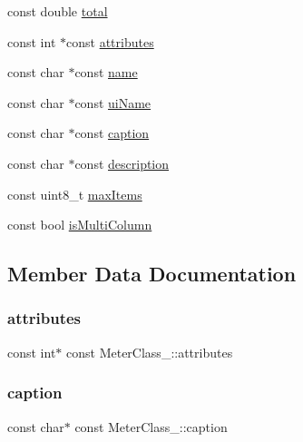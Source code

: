 \begin{DoxyCompactItemize}
const double \hyperlink{structMeterClass___ab09ccbd8eced02558e4b8f5e89d26516}{total}
\item 
const int $\ast$const \hyperlink{structMeterClass___a1a0ec53c0d54b5ba65574802d4d537d1}{attributes}
\item 
const char $\ast$const \hyperlink{structMeterClass___aacd3db709a2b1f8ec65b8ce790160517}{name}
\item 
const char $\ast$const \hyperlink{structMeterClass___a12dd981850eed64228040e63c3b8379c}{ui\+Name}
\item 
const char $\ast$const \hyperlink{structMeterClass___a056b138245364d09803667068b31ad01}{caption}
\item 
const char $\ast$const \hyperlink{structMeterClass___a63362cebe1c79f84cfc17ef768ae92a9}{description}
\item 
const uint8\+\_\+t \hyperlink{structMeterClass___ad0d774d2d1dffebfb4424604f46e488e}{max\+Items}
\item 
const bool \hyperlink{structMeterClass___a7ba44f415cad908fa7e99206be9566cc}{is\+Multi\+Column}
\end{DoxyCompactItemize}


\subsection{Member Data Documentation}
\mbox{\label{structMeterClass___a1a0ec53c0d54b5ba65574802d4d537d1}} 
\subsubsection{\texorpdfstring{attributes}{attributes}}
{\footnotesize\ttfamily const int$\ast$ const Meter\+Class\+\_\+\+::attributes}

\mbox{\label{structMeterClass___a056b138245364d09803667068b31ad01}} 
\subsubsection{\texorpdfstring{caption}{caption}}
{\footnotesize\ttfamily const char$\ast$ const Meter\+Class\+\_\+\+::caption}

